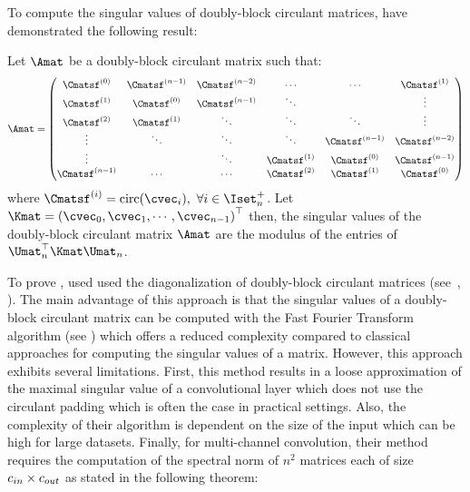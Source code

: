 To compute the singular values of doubly-block circulant matrices, \citet{sedghi2018singular} have demonstrated the following result:
\begin{theorem} \label{theorem:ch3-singular_values_doubly_block_circulant}
  Let $\Amat$ be a doubly-block circulant matrix such that:
  \begin{equation*}
    \Amat = \leftmatrix
      \Cmatsf^{(0)}   & \Cmatsf^{(n-1)} & \Cmatsf^{(n-2)} & \cdots        & \cdots          & \Cmatsf^{(1)}   \\
      \Cmatsf^{(1)}   & \Cmatsf^{(0)}   & \Cmatsf^{(n-1)} & \ddots        &                 & \vdots          \\
      \Cmatsf^{(2)}   & \Cmatsf^{(1)}   & \ddots          & \ddots        & \ddots          & \vdots          \\
      \vdots          & \ddots          & \ddots          & \ddots        & \Cmatsf^{(n-1)} & \Cmatsf^{(n-2)} \\
      \vdots          &                 & \ddots          & \Cmatsf^{(1)} & \Cmatsf^{(0)}   & \Cmatsf^{(n-1)} \\
      \Cmatsf^{(n-1)} & \cdots          & \cdots          & \Cmatsf^{(2)} & \Cmatsf^{(1)}   & \Cmatsf^{(0)}
    \rightmatrix
  \end{equation*}
  where $\Cmatsf^{(i)} = \circulant({\cvec_i}),\ \forall i \in \Iset_n^+$.
  Let $\Kmat = \leftmat \cvec_0, \cvec_1, \cdots, \cvec_{n-1} \rightmat^\top$ then, the singular values of the doubly-block circulant matrix $\Amat$ are the modulus of the entries of $\Umat_n^\top \Kmat \Umat_n$.
\end{theorem}


\noindent
To prove , \citet{sedghi2018singular} used used the diagonalization of doubly-block circulant matrices (see~, ).
The main advantage of this approach is that the singular values of a doubly-block circulant matrix can be computed with the Fast Fourier Transform algorithm (see ) which offers a reduced complexity compared to classical approaches for computing the singular values of a matrix.
However, this approach exhibits several limitations.
First, this method results in a loose approximation of the maximal singular value of a convolutional layer which does not use the circulant padding which is often the case in practical settings.
Also, the complexity of their algorithm is dependent on the size of the input which can be high for large datasets.
Finally, for multi-channel convolution, their method requires the computation of the spectral norm of $n^2$ matrices each of size $c_{in} \times c_{out}$ as stated in the following theorem:

